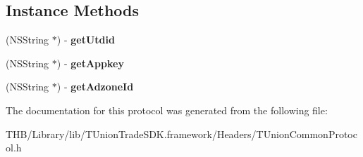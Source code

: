 \subsection*{Instance Methods}
\begin{DoxyCompactItemize}
\item 
\mbox{\label{protocol_t_union_common_protocol_01-p_a1ad24d11b898b1fbf2ed122da8a4da21}} 
(N\+S\+String $\ast$) -\/ {\bfseries get\+Utdid}
\item 
\mbox{\label{protocol_t_union_common_protocol_01-p_a42a9e9045de3600c8edf67e1dedcf865}} 
(N\+S\+String $\ast$) -\/ {\bfseries get\+Appkey}
\item 
\mbox{\label{protocol_t_union_common_protocol_01-p_aab7b9d6855fad00c869aeed628da8049}} 
(N\+S\+String $\ast$) -\/ {\bfseries get\+Adzone\+Id}
\end{DoxyCompactItemize}


The documentation for this protocol was generated from the following file\+:\begin{DoxyCompactItemize}
\item 
T\+H\+B/\+Library/lib/\+T\+Union\+Trade\+S\+D\+K.\+framework/\+Headers/T\+Union\+Common\+Protocol.\+h\end{DoxyCompactItemize}
